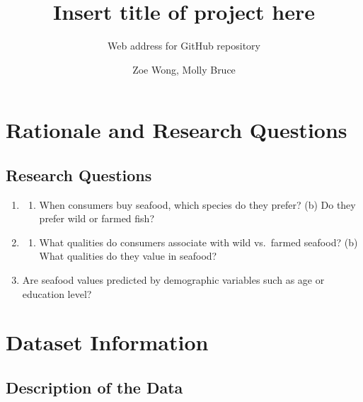 \documentclass[
  12pt,
]{article}
\title{Insert title of project here}
\subtitle{Web address for GitHub repository}
\author{Zoe Wong, Molly Bruce}
\date{}
\providecommand{\tightlist}{%
  \setlength{\itemsep}{0pt}\setlength{\parskip}{0pt}}
\begin{document}
\maketitle

\newpage
\tableofcontents 
\newpage
\listoftables 
\newpage
\listoffigures 
\newpage

\hypertarget{rationale-and-research-questions}{%
\section{Rationale and Research
Questions}\label{rationale-and-research-questions}}

\hypertarget{research-questions}{%
\subsection{Research Questions}\label{research-questions}}

\begin{enumerate}
\def\labelenumi{\arabic{enumi}.}
\item
  \begin{enumerate}
  \def\labelenumii{(\alph{enumii})}
  \tightlist
  \item
    When consumers buy seafood, which species do they prefer? (b) Do
    they prefer wild or farmed fish?
  \end{enumerate}
\item
  \begin{enumerate}
  \def\labelenumii{(\alph{enumii})}
  \tightlist
  \item
    What qualities do consumers associate with wild vs.~farmed seafood?
    (b) What qualities do they value in seafood?
  \end{enumerate}
\item
  Are seafood values predicted by demographic variables such as age or
  education level?
\end{enumerate}

\newpage

\hypertarget{dataset-information}{%
\section{Dataset Information}\label{dataset-information}}

\hypertarget{description-of-the-data}{%
\subsection{Description of the Data}\label{description-of-the-data}}
\end{document}

